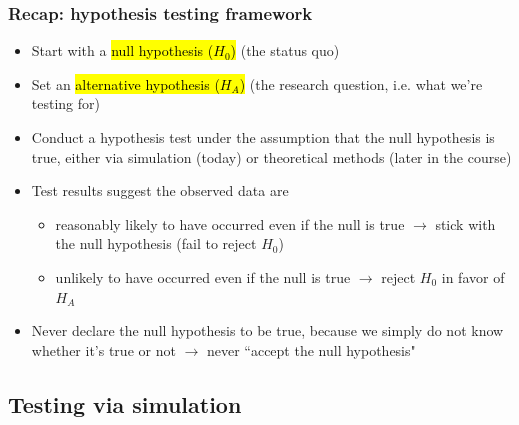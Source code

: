 \documentclass[slidestop,compress,mathserif,12pt,t,professionalfonts,xcolor=table]{beamer}
\begin{document}
\begin{frame}
\frametitle{Recap: hypothesis testing framework}

\begin{itemize}
\item Start with a \hl{null hypothesis ($H_0$)} (the status quo)

\pause

\item Set an \hl{alternative hypothesis ($H_A$)} (the research question, i.e. what we're testing for)

\pause

\item Conduct a hypothesis test under the assumption that the null hypothesis is true, either via simulation (today) or theoretical methods (later in the course)

\pause

\item Test results suggest the observed data are 
\begin{itemize}
\item reasonably likely to have occurred even if the null is true $\rightarrow$ stick with the null hypothesis (fail to reject $H_0$)
\item unlikely to have occurred even if the null is true $\rightarrow$ reject $H_0$ in favor of $H_A$
\end{itemize}

\pause

\item Never declare the null hypothesis to be true, because we simply do not know whether it's true or not $\rightarrow$ never ``accept the null hypothesis"

\end{itemize}

\end{frame}


\subsection{Testing via simulation}

\end{document}
